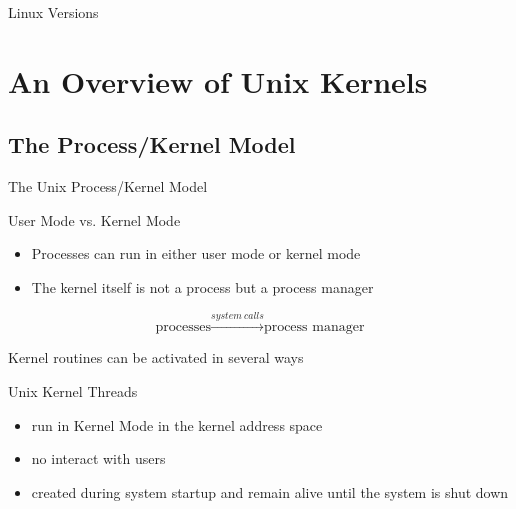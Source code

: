\begin{frame}{Linux Versions}
  \begin{center}
     
  \end{center}
\end{frame}

\section{An Overview of Unix Kernels}
\label{sec:an-overview-unix-1}

\subsection{The Process/Kernel Model}
\label{sec:processkernel-model}

\begin{frame}{The Unix Process/Kernel Model}%
  \begin{exampleblock}{User Mode vs. Kernel Mode}
    \begin{itemize}
    \item Processes can run in either user mode or kernel mode
    \item The kernel itself is not a process but a process manager
    \end{itemize}
  \end{exampleblock}
  $$\text{processes} \xrightarrow{system\ calls} \text{process manager}$$
\end{frame}

\begin{frame}
  \begin{exampleblock}{Kernel routines can be activated in several ways}
    \begin{center}
       
    \end{center}
  \end{exampleblock}
\end{frame}

\begin{frame}
  \begin{exampleblock}{Unix Kernel Threads}
    \begin{itemize}
    \item run in Kernel Mode in the kernel address space
    \item no interact with users
    \item created during system startup and remain alive until the system is
      shut down
    \end{itemize}
  \end{exampleblock}
\end{frame}

